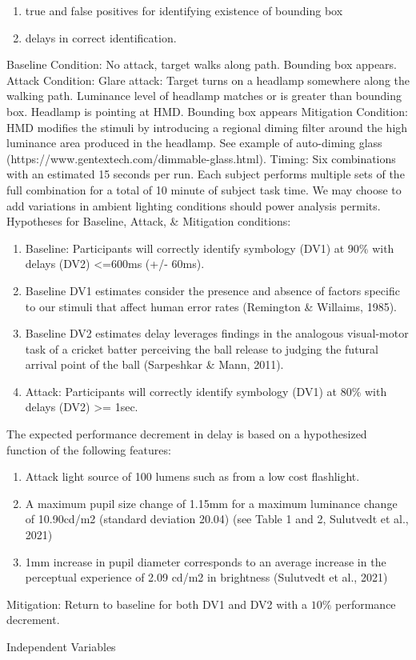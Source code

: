 \begin{enumerate}
    \item true and false positives for identifying existence of bounding box
    \item delays in correct identification.
\end{enumerate}
Baseline Condition: No attack, target walks along path. Bounding box appears.
Attack Condition: Glare attack: Target turns on a headlamp somewhere along the walking path.
Luminance level of headlamp matches or is greater than bounding box. Headlamp is pointing at HMD.
Bounding box appears
Mitigation Condition: HMD modifies the stimuli by introducing a regional diming filter around the high
luminance area produced in the headlamp. See example of auto-diming glass
(https://www.gentextech.com/dimmable-glass.html).
Timing: Six combinations with an estimated 15 seconds per run. Each subject performs multiple sets of the
full combination for a total of 10 minute of subject task time. We may choose to add variations in ambient
lighting conditions should power analysis permits.
Hypotheses for Baseline, Attack, \& Mitigation conditions:
\begin{enumerate}
\item Baseline: Participants will correctly identify symbology (DV1) at $90\%$ with delays (DV2) <=600ms (+/- 60ms).
\item  Baseline DV1 estimates consider the presence and absence of factors specific to our
stimuli that affect human error rates (Remington \& Willaims, 1985).
\item Baseline DV2 estimates delay leverages findings in the analogous visual-motor task of a
cricket batter perceiving the ball release to judging the futural arrival point of the ball
(Sarpeshkar \& Mann, 2011).
\item Attack: Participants will correctly identify symbology (DV1) at $80\%$ with delays (DV2) >= 1sec.
\end{enumerate}
The expected performance decrement in delay is based on a hypothesized function of the following features:
\begin{enumerate} 
    \item Attack light source of 100 lumens such as from a low cost flashlight.
\item A maximum pupil size change of 1.15mm for a maximum luminance change of 10.90cd/m2 (standard deviation 20.04) (see Table 1 and 2, Sulutvedt et al., 2021)
\item 1mm increase in pupil diameter corresponds to an average increase in the perceptual experience of 2.09 cd/m2 in brightness (Sulutvedt et al., 2021)
\end{enumerate}
Mitigation: Return to baseline for both DV1 and DV2 with a $10\%$ performance decrement. 

Independent Variables

